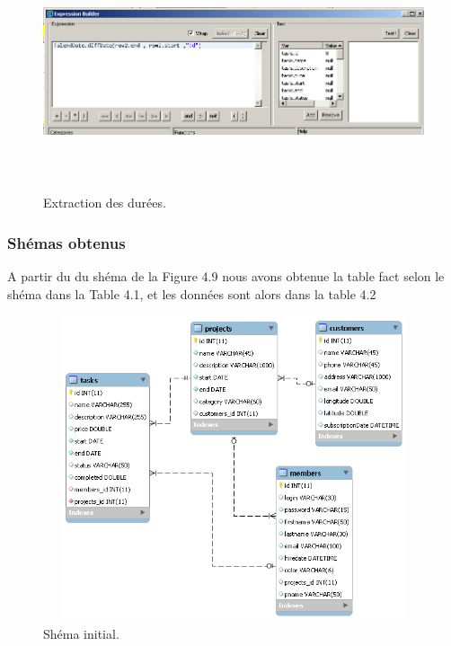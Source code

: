 \begin{figure}[H]
\center
\includegraphics[width=12cm,height=7cm]{./figures/integ2.png}
\caption{Extraction des  dur\'{e}es.}
\end{figure}



\newpage

\subsubsection{Sh\'{e}mas obtenus}
A partir du du sh\'{e}ma de la Figure 4.9 nous avons obtenue la table fact selon le sh\'{e}ma dans la Table 4.1,
et les donn\'{e}es sont alors dans la table 4.2

\FloatBarrier

\begin{figure}[H]
\center
\includegraphics[width=14cm,height=9cm]{./figures/s1.png}
\caption{Sh\'{e}ma initial.}
\end{figure}



